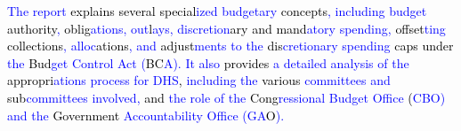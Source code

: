 \begin{tcolorbox}
    \textcolor{blue}{The} \textcolor{blue}{report} \textcolor{black}{explains} \textcolor{black}{several} \textcolor{black}{special}\textcolor{blue}{ized} \textcolor{blue}{budget}\textcolor{blue}{ary} \textcolor{black}{concepts}\textcolor{blue}{,} \textcolor{blue}{including} \textcolor{blue}{budget} \textcolor{black}{authority}\textcolor{blue}{,} \textcolor{black}{oblig}\textcolor{blue}{ations}\textcolor{blue}{,} \textcolor{blue}{out}\textcolor{black}{l}\textcolor{blue}{ays}\textcolor{blue}{,} \textcolor{blue}{dis}\textcolor{blue}{cret}\textcolor{blue}{ion}\textcolor{black}{ary} \textcolor{black}{and} \textcolor{black}{mand}\textcolor{blue}{atory} \textcolor{blue}{sp}\textcolor{blue}{ending}\textcolor{blue}{,} \textcolor{black}{offset}\textcolor{blue}{ting} \textcolor{black}{collections}\textcolor{blue}{,} \textcolor{blue}{alloc}\textcolor{black}{ations}\textcolor{blue}{,} \textcolor{blue}{and} \textcolor{black}{adjust}\textcolor{blue}{ments} \textcolor{blue}{to} \textcolor{blue}{the} \textcolor{black}{dis}\textcolor{blue}{cret}\textcolor{blue}{ion}\textcolor{blue}{ary} \textcolor{blue}{sp}\textcolor{blue}{ending} \textcolor{black}{caps} \textcolor{black}{under} \textcolor{blue}{the} \textcolor{black}{Bud}\textcolor{blue}{get} \textcolor{blue}{Control} \textcolor{blue}{Act} \textcolor{blue}{(}\textcolor{black}{BC}\textcolor{blue}{A}\textcolor{blue}{).} \textcolor{blue}{It} \textcolor{blue}{also} \textcolor{black}{provides} \textcolor{blue}{a} \textcolor{blue}{detailed} \textcolor{blue}{analysis} \textcolor{blue}{of} \textcolor{blue}{the} \textcolor{black}{appropri}\textcolor{blue}{ations} \textcolor{blue}{process} \textcolor{blue}{for} \textcolor{blue}{D}\textcolor{blue}{HS}\textcolor{black}{,} \textcolor{blue}{including} \textcolor{blue}{the} \textcolor{black}{various} \textcolor{blue}{comm}\textcolor{blue}{itte}\textcolor{blue}{es} \textcolor{blue}{and} \textcolor{black}{sub}\textcolor{blue}{comm}\textcolor{blue}{itte}\textcolor{blue}{es} \textcolor{blue}{involved}\textcolor{blue}{,} \textcolor{black}{and} \textcolor{blue}{the} \textcolor{blue}{role} \textcolor{blue}{of} \textcolor{blue}{the} \textcolor{black}{Cong}\textcolor{blue}{r}\textcolor{blue}{essional} \textcolor{blue}{Bud}\textcolor{blue}{get} \textcolor{blue}{Office} \textcolor{black}{(}\textcolor{blue}{C}\textcolor{blue}{BO}\textcolor{blue}{)} \textcolor{blue}{and} \textcolor{blue}{the} \textcolor{black}{Government} \textcolor{blue}{Account}\textcolor{blue}{ability} \textcolor{blue}{Office} \textcolor{blue}{(}\textcolor{blue}{GA}\textcolor{black}{O}\textcolor{blue}{).}
    

\end{tcolorbox}

